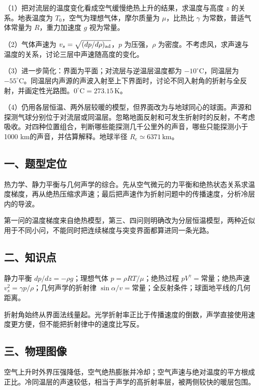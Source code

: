\documentclass[12pt,a4paper,fontset=fandol]{ctexart}
\begin{document}
（1）把对流层的温度变化看成空气缓慢绝热上升的结果，求温度与高度 \(z\)
的关系。地表温度为 \(T_0\)，空气为理想气体，摩尔质量为 \(\mu\)，比热比
\(\gamma\) 为常数，普适气体常量为 \(R\)，重力加速度 \(g\) 视为常量。

（2）气体声速为 \(v_s=\sqrt{(dp/d\rho)_{\rm ad}}\)，\(p\)
为压强，\(\rho\)
为密度。不考虑风，求声速与温度的关系，讨论三层中声速随高度的变化。

（3）进一步简化：界面为平面；对流层与逆温层温度都为
\(-10^\circ\mathrm C\)，同温层为
\(-55^\circ\mathrm C\)。同温层内声源的声波入射至上下界面时，讨论不同入射角的折射与全反射，并画定性光路图。\(0^\circ\mathrm C=273.15\,\mathrm K\)。

（4）仍用各层恒温、两外层较暖的模型，但界面改为与地球同心的球面。声源和探测气球分别位于对流层或同温层。忽略地面反射和可发生折射时的反射，不考虑吸收。对四种位置组合，判断哪些能探测几千公里外的声音，哪些只能探测小于1000
km的声音，并估算解释。地球半径 \(R_e\simeq6371\,\mathrm{km}\)。

\subsection{一、题型定位}\label{ux4e00ux9898ux578bux5b9aux4f4d-6}

热力学、静力平衡与几何声学的综合。先从空气微元的力平衡和绝热状态关系求温度梯度，再从绝热压缩求声速；最后把声速作为折射问题中的传播速度，分析冷层内的导波。

第一问的温度梯度来自绝热模型，第三、四问则明确改为分层恒温模型，两种近似用于不同小问，不能同时把连续梯度与突变界面都算进同一条光路。

\subsection{二、知识点}\label{ux4e8cux77e5ux8bc6ux70b9-6}

静力平衡 \(dp/dz=-\rho g\)；理想气体 \(p=\rho RT/\mu\)；绝热过程
\(pV^\gamma=\)常量；绝热声速 \(v_s^2=\gamma p/\rho\)；几何声学的折射律
\(\sin\alpha/v=\)常量；全反射条件；球面地平线的几何距离。

折射角始终从界面法线量起。光学折射率正比于传播速度的倒数，声学直接使用速度更方便，但不能把折射律中的速度比写反。

\subsection{三、物理图像}\label{ux4e09ux7269ux7406ux56feux50cf-6}

空气上升时外界压强降低，空气绝热膨胀并冷却；空气声速与绝对温度的平方根成正比。冷同温层的声速较低，相当于声学的高折射率层，被两侧较快的暖层包围。
\end{document}
